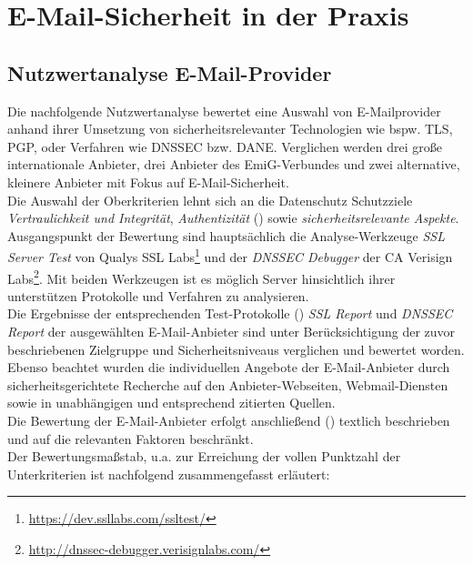 \documentclass  [paper=a4,
				fontsize=12pt,
				listof=totoc,
				bibliography=totoc
				]{scrreprt}
\begin{document}
	\chapter{E-Mail-Sicherheit in der Praxis}
		\section{Nutzwertanalyse E-Mail-Provider}
		\label{sec:nwa}
			Die nachfolgende Nutzwertanalyse bewertet eine Auswahl von E-Mailprovider anhand ihrer Umsetzung von sicherheitsrelevanter Technologien wie bspw. \ac{TLS}, \ac{PGP}, oder Verfahren wie \ac{DNSSEC} bzw. \ac{DANE}.
			Verglichen werden drei große internationale Anbieter, drei Anbieter des \ac{EmiG}-Verbundes und zwei alternative, kleinere Anbieter mit Fokus auf E-Mail-Sicherheit.\\		
			Die Auswahl der Oberkriterien lehnt sich an die Datenschutz Schutzziele \textit{Vertraulichkeit und Integrität}, \textit{Authentizität} () sowie \textit{sicherheitsrelevante Aspekte}.\\
			Ausgangspunkt der Bewertung sind hauptsächlich die Analyse-Werkzeuge \textit{SSL Server Test} von Qualys SSL Labs\footnote{\url{https://dev.ssllabs.com/ssltest/}} und der \textit{DNSSEC Debugger} der \ac{CA} Verisign Labs\footnote{\url{http://dnssec-debugger.verisignlabs.com/}}.
			Mit beiden Werkzeugen ist es möglich Server hinsichtlich ihrer unterstützen Protokolle und Verfahren zu analysieren.\medskip\\
			Die Ergebnisse der entsprechenden Test-Protokolle () \textit{SSL Report} und \textit{DNSSEC Report} der ausgewählten E-Mail-Anbieter sind unter Berücksichtigung der zuvor beschriebenen Zielgruppe und Sicherheitsniveaus verglichen und bewertet worden.\\
			Ebenso beachtet wurden die individuellen Angebote der E-Mail-Anbieter durch sicherheitsgerichtete Recherche auf den Anbieter-Webseiten, Webmail-Diensten sowie in unabhängigen und entsprechend zitierten Quellen.\\
			Die Bewertung der E-Mail-Anbieter erfolgt anschließend () textlich beschrieben und auf die relevanten Faktoren beschränkt.\medskip\\
			Der Bewertungsmaßstab, u.a. zur Erreichung der vollen Punktzahl der Unterkriterien ist nachfolgend zusammengefasst erläutert:
			
\end{document}

